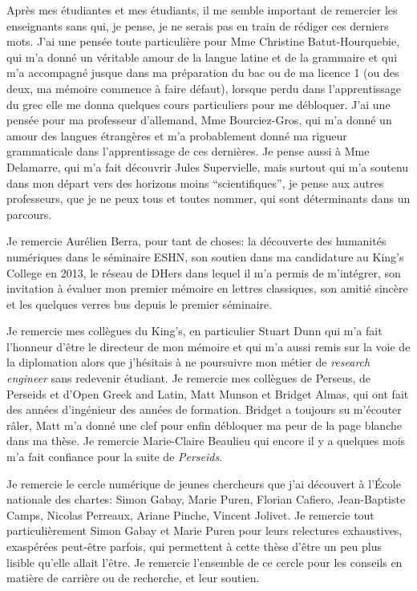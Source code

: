 Après mes étudiantes et mes étudiants, il me semble important de remercier les enseignants sans qui, je pense, je ne serais pas en train de rédiger ces derniers mots. J'ai une pensée toute particulière pour Mme Christine Batut-Hourquebie, qui m'a donné un véritable amour de la langue latine et de la grammaire et qui m'a accompagné jusque dans ma préparation du bac ou de ma licence 1 (ou des deux, ma mémoire commence à faire défaut), lorsque perdu dans l'apprentissage du grec elle me donna quelques cours particuliers pour me débloquer. J'ai une pensée pour ma professeur d'allemand, Mme Bourciez-Gros, qui m'a donné un amour des langues étrangères et m'a probablement donné ma rigueur grammaticale dans l'apprentissage de ces dernières. Je pense aussi à Mme Delamarre, qui m'a fait découvrir Jules Supervielle, mais surtout qui m'a soutenu dans mon départ vers des horizons moins \enquote{scientifiques}, je pense aux autres professeurs, que je ne peux tous et toutes nommer, qui sont déterminants dans un parcours.

Je remercie Aurélien Berra, pour tant de choses: la découverte des humanités numériques dans le séminaire ESHN, son soutien dans ma candidature au King's College en 2013, le réseau de DHers dans lequel il m'a permis de m'intégrer, son invitation à évaluer mon premier mémoire en lettres classiques, son amitié sincère et les quelques verres bus depuis le premier séminaire.

Je remercie mes collègues du King's, en particulier Stuart Dunn qui m'a fait l'honneur d'être le directeur de mon mémoire et qui m'a aussi remis sur la voie de la diplomation alors que j'hésitais à ne poursuivre mon métier de \textit{research engineer} sans redevenir étudiant. Je remercie mes collègues de Perseus, de Perseids et d'Open Greek and Latin, Matt Munson et Bridget Almas, qui ont fait des années d'ingénieur des années de formation. Bridget a toujours su m'écouter râler, Matt m'a donné une clef pour enfin débloquer ma peur de la page blanche dans ma thèse. Je remercie Marie-Claire Beaulieu qui encore il y a quelques mois m'a fait confiance pour la suite de \textit{Perseids}.

Je remercie le cercle numérique de jeunes chercheurs que j'ai découvert à l'École nationale des chartes: Simon Gabay, Marie Puren, Florian Cafiero, Jean-Baptiste Camps, Nicolas Perreaux, Ariane Pinche, Vincent Jolivet. Je remercie tout particulièrement Simon Gabay et Marie Puren pour leurs relectures exhaustives, exaspérées peut-être parfois, qui permettent à cette thèse d'être un peu plus lisible qu'elle allait l'être. Je remercie l'ensemble de ce cercle pour les conseils en matière de carrière ou de recherche, et leur soutien.

